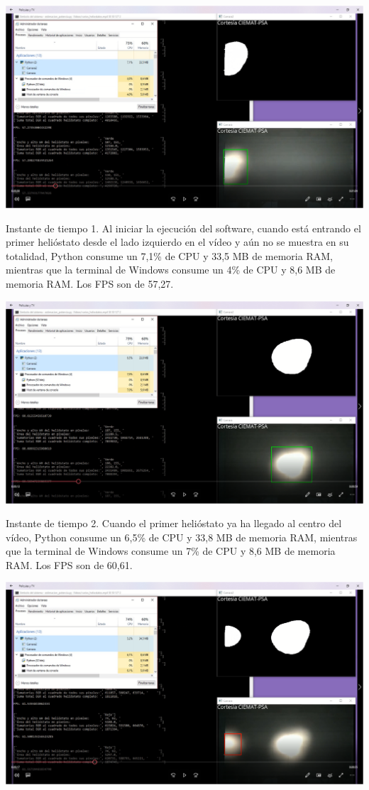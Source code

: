 \documentclass[12pt]{article}
\begin{document}
\includegraphics[width=\textwidth]{CapturasRendimientoSoftware1/Imagen1.png}

Instante de tiempo 1. Al iniciar la ejecución del software, cuando está entrando el primer helióstato desde el lado izquierdo en el vídeo y aún no se muestra en su totalidad, Python consume un 7,1\% de CPU y 33,5 MB de memoria RAM, mientras que la terminal de Windows consume un 4\% de CPU y 8,6 MB de memoria RAM. Los FPS son de 57,27.


\includegraphics[width=\textwidth]{CapturasRendimientoSoftware1/Imagen2.png}

Instante de tiempo 2. Cuando el primer helióstato ya ha llegado al centro del vídeo, Python consume un 6,5\% de CPU y 33,8 MB de memoria RAM, mientras que la terminal de Windows consume un 7\% de CPU y 8,6 MB de memoria RAM. Los FPS son de 60,61.


\includegraphics[width=\textwidth]{CapturasRendimientoSoftware1/Imagen3.png}
\end{document}

